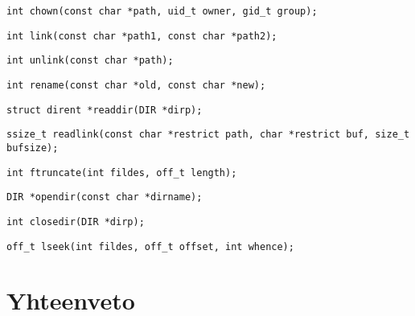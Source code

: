 \begin{verbatim}
int chown(const char *path, uid_t owner, gid_t group);
\end{verbatim}

\begin{verbatim}
int link(const char *path1, const char *path2);
\end{verbatim}

\begin{verbatim}
int unlink(const char *path);
\end{verbatim}

\begin{verbatim}
int rename(const char *old, const char *new);
\end{verbatim}

\begin{verbatim}
struct dirent *readdir(DIR *dirp);
\end{verbatim}

\begin{verbatim}
ssize_t readlink(const char *restrict path, char *restrict buf, size_t bufsize);
\end{verbatim}

\begin{verbatim}
int ftruncate(int fildes, off_t length);
\end{verbatim}

\begin{verbatim}
DIR *opendir(const char *dirname);
\end{verbatim}

\begin{verbatim}
int closedir(DIR *dirp);
\end{verbatim}

\begin{verbatim}
off_t lseek(int fildes, off_t offset, int whence);
\end{verbatim}

\section{Yhteenveto}
